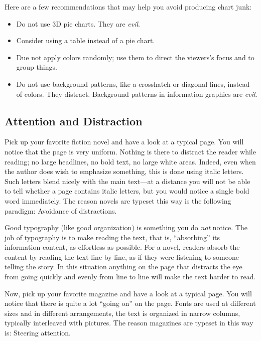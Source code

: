 Here are a few recommendations that may help you avoid producing chart junk:
\begin{itemize}
\item
  Do not use 3D pie charts. They are \emph{evil}.
\item
  Consider using a table instead of a pie chart.
\item
  Due not apply colors randomly; use them to direct the viewers's
  focus and
  to group things.
\item
  Do not use background patterns, like a crosshatch or diagonal
  lines, instead of colors. They distract. Background patterns in
  information graphics are \emph{evil}.
\end{itemize}



\subsection{Attention and Distraction}

Pick up your favorite fiction novel and have a look at a typical
page. You will notice that the page is very uniform. Nothing is there
to distract the reader while reading; no large headlines, no bold
text, no large white areas. Indeed, even when the author does wish to
emphasize something, this is done using italic letters. Such letters
blend nicely with the main text---at a distance you will not be able to
tell whether a page contains italic letters, but you would notice a
single bold word immediately. The reason novels are typeset this way
is the following paradigm: Avoidance of distractions.

Good typography (like good organization) is something you do
\emph{not} notice. The job of typography is to make reading the text,
that is, ``absorbing'' its information content, as effortless as
possible. For a novel, readers absorb the content by reading the text
line-by-line, as if they were listening to someone telling the
story. In this situation anything on the page that distracts the eye
from  going quickly and evenly from line to line will make the text
harder to read.

Now, pick up your favorite magazine and have a look at a typical
page. You will notice that there is quite a lot ``going on'' on the
page. Fonts are used at different sizes and in different arrangements,
the text is organized in narrow columns, typically interleaved with
pictures. The reason magazines are typeset in this way is: Steering
attention.

